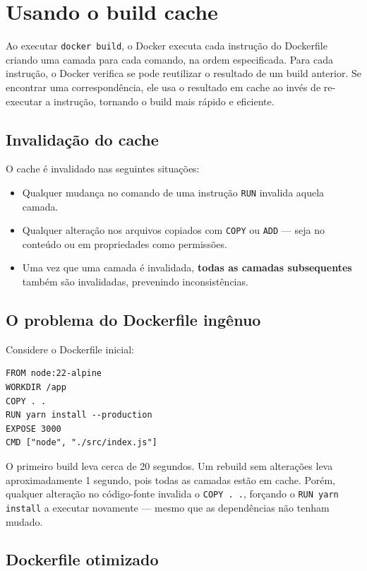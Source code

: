 \section{Usando o build cache}

Ao executar \texttt{docker build}, o Docker executa cada instrução do Dockerfile criando uma camada para cada comando, na ordem especificada. Para cada instrução, o Docker verifica se pode reutilizar o resultado de um build anterior. Se encontrar uma correspondência, ele usa o resultado em cache ao invés de re-executar a instrução, tornando o build mais rápido e eficiente.

\subsection{Invalidação do cache}

O cache é invalidado nas seguintes situações:

\begin{itemize}
    \item Qualquer mudança no comando de uma instrução \texttt{RUN} invalida aquela camada.
    \item Qualquer alteração nos arquivos copiados com \texttt{COPY} ou \texttt{ADD} --- seja no conteúdo ou em propriedades como permissões.
    \item Uma vez que uma camada é invalidada, \textbf{todas as camadas subsequentes} também são invalidadas, prevenindo inconsistências.
\end{itemize}

\subsection{O problema do Dockerfile ingênuo}

Considere o Dockerfile inicial:

\begin{verbatim}
FROM node:22-alpine
WORKDIR /app
COPY . .
RUN yarn install --production
EXPOSE 3000
CMD ["node", "./src/index.js"]
\end{verbatim}

O primeiro build leva cerca de 20 segundos. Um rebuild sem alterações leva aproximadamente 1 segundo, pois todas as camadas estão em cache. Porém, qualquer alteração no código-fonte invalida o \texttt{COPY .\ .}, forçando o \texttt{RUN yarn install} a executar novamente --- mesmo que as dependências não tenham mudado.

\subsection{Dockerfile otimizado}

